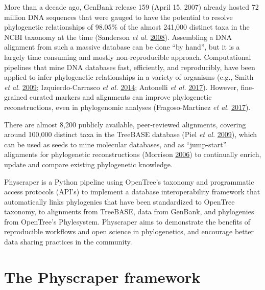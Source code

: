 \documentclass[]{article}
\begin{document}
More than a decade ago, GenBank release 159 (April 15, 2007) already hosted 72 million DNA sequences that were gauged to have the potential to resolve phylogenetic relationships of 98.05\% of the almost 241,000 distinct taxa in the NCBI taxonomy at the time (Sanderson \emph{et al.} \protect\hyperlink{ref-sanderson2008phylota}{2008}). Assembling a DNA alignment from such a massive database can be done ``by hand'', but it is a largely time consuming and mostly non-reproducible approach. Computational pipelines that mine DNA databases fast, efficiently, and reproducibly, have been applied to infer phylogenetic relationships in a variety of organisms (e.g., Smith \emph{et al.} \protect\hyperlink{ref-smith2009mega}{2009}; Izquierdo-Carrasco \emph{et al.} \protect\hyperlink{ref-izquierdo2014pumper}{2014}; Antonelli \emph{et al.} \protect\hyperlink{ref-antonelli2017toward}{2017}).
However, fine-grained curated markers and alignments can improve phylogenetic reconstructions, even in phylogenomic analyses (Fragoso-Martínez \emph{et al.} \protect\hyperlink{ref-fragoso2017pilot}{2017}).

There are almost 8,200 publicly available, peer-reviewed alignments, covering around 100,000 distinct taxa in the TreeBASE database (Piel \emph{et al.} \protect\hyperlink{ref-piel2009treebase}{2009}), which can be used as seeds to mine molecular databases, and as ``jump-start'' alignments for phylogenetic reconstructions (Morrison \protect\hyperlink{ref-morrison2006multiple}{2006}) to continually enrich, update and compare existing phylogenetic knowledge.

Physcraper is a Python pipeline using OpenTree's taxonomy and programmatic access protocols (API's) to implement a database interoperability framework that automatically links phylogenies that have been standardized to OpenTree taxonomy, to alignments from TreeBASE, data from GenBank, and phylogenies from OpenTree's Phylesystem.
Physcraper aims to demonstrate the benefits of reproducible workflows and open science in phylogenetics, and encourage better data sharing practices in the community.

\hypertarget{the-physcraper-framework}{%
\section{The Physcraper framework}\label{the-physcraper-framework}}
\end{document}
